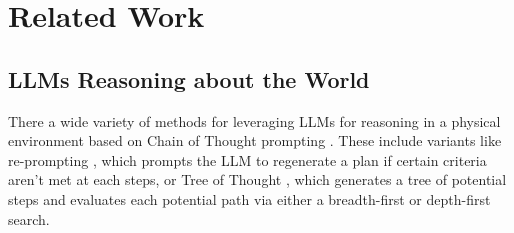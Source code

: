 \section{Related Work}

\subsection{LLMs Reasoning about the World}
There a wide variety of methods for leveraging LLMs for reasoning in a physical environment based on Chain of Thought prompting \cite{CoT}. These include variants like re-prompting \cite{reprompt}, which prompts the LLM to regenerate a plan if certain criteria aren't met at each steps, or Tree of Thought \cite{ToT}, which generates a tree of potential steps and evaluates each potential path via either a breadth-first or depth-first search. 

